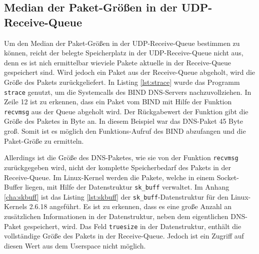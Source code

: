 \documentclass[a4paper, 12pt, BCOR10mm, DIV12, toc=bibliography, toc=listof, german]{scrbook}
\begin{document}
		\subsection*{Median der Paket-Größen in der UDP-Receive-Queue} %

		Um den Median der Paket-Größen in der UDP-Receive-Queue bestimmen zu können, reicht der belegte
		Speicherplatz in der UDP-Receive-Queue nicht aus, denn es ist nich ermittelbar wieviele Pakete
		aktuelle in der Receive-Queue gespeichert sind. Wird jedoch ein Paket aus der Receive-Queue
		abgeholt, wird die Größe des Pakets zurückgeliefert. In Listing \ref{lst:strace} wurde das
		Programm \texttt{strace} genutzt, um die Systemcalls des BIND DNS-Servers nachzuvollziehen. In
		Zeile 12 ist zu erkennen, dass ein Paket vom BIND mit Hilfe der Funktion \texttt{recvmsg} aus
		der Queue abgeholt wird. Der Rückgabewert der Funktion gibt die Größe des Paketes in Byte an. In
		diesem Beispiel war das DNS-Paket 45 Byte groß. Somit ist es möglich den Funktions-Aufruf des
		BIND abzufangen und die Paket-Größe zu ermitteln.

		Allerdings ist die Größe des DNS-Paketes, wie sie von der Funktion \texttt{recvmsg}
		zurückgegeben wird, nicht der komplette Speicherbedarf des Pakets in der Receive-Queue. Im
		Linux-Kernel werden die Pakete, welche in einem Socket-Buffer liegen, mit Hilfe der
		Datenstruktur \texttt{sk\_buff} verwaltet. Im Anhang \ref{cha:skbuff} ist das Listing
		\ref{lst:skbuff} der \texttt{sk\_buff}-Datenstruktur für den Linux-Kernels 2.6.18 angeführt. Es ist
		zu erkennen, dass es eine große Anzahl an zusätzlichen Informationen in der Datenstruktur, neben
		dem eigentlichen DNS-Paket gespeichert, wird. Das Feld \texttt{truesize} in der Datenstruktur,
		enthält die vollständige Größe des Pakets in der Receive-Queue. Jedoch ist ein Zugriff auf
		diesen Wert aus dem Userspace nicht möglich.
		
\end{document}
